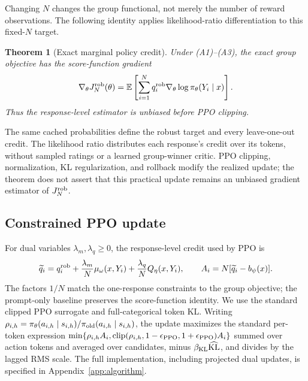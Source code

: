 \documentclass{article}
\newtheorem{theorem}{Theorem}
\theoremstyle{definition}
\theoremstyle{remark}
\begin{document}
Changing \(N\) changes the group functional, not merely the number of reward
observations. The following identity applies likelihood-ratio differentiation
\citep{williams1992simple,sutton1999policy} to this fixed-\(N\) target.

\begin{theorem}[Exact marginal policy credit]
\label{thm:main-gradient}
Under (A1)--(A3), the exact group objective has the score-function gradient
\begin{equation}
\label{eq:robust-policy-gradient}
\nabla_\theta J_N^{\rm rob}(\theta)=\mathbb E\left[
\sum_{i=1}^{N}q_i^{\rm rob}\nabla_\theta\log\pi_\theta(Y_i\mid x)\right].
\end{equation}
Thus the response-level estimator is unbiased before PPO clipping.
\end{theorem}

The same cached probabilities define the robust target and every leave-one-out
credit. The likelihood ratio distributes each response's credit over its
tokens, without sampled ratings or a learned group-winner critic. PPO clipping,
normalization, KL regularization, and rollback modify the realized update;
the theorem does not assert that this practical update remains an unbiased
gradient estimator of \(J_N^{\rm rob}\).

\subsection{Constrained PPO update}
\label{subsec:constrained-credit}

For dual variables \(\lambda_m,\lambda_q\ge0\), the response-level credit used
by PPO is
\begin{equation}
\label{eq:constrained-credit}
\widetilde q_i=q_i^{\rm rob}+\frac{\lambda_m}{N}\mu_\omega(x,Y_i)
 +\frac{\lambda_q}{N}Q_\eta(x,Y_i),\qquad
A_i=N[\widetilde q_i-b_\psi(x)].
\end{equation}
The factors \(1/N\) match the one-response constraints to the group objective;
the prompt-only baseline preserves the score-function identity.  We use the
standard clipped PPO surrogate \citep{schulman2017proximal} and
full-categorical token KL.  Writing
\(\rho_{i,h}=\pi_\theta(a_{i,h}\mid s_{i,h})/
\pi_{\rm old}(a_{i,h}\mid s_{i,h})\), the update maximizes the standard
per-token expression \(\min\{\rho_{i,h}A_i,
\operatorname{clip}(\rho_{i,h},1-\epsilon_{\rm PPO},1+\epsilon_{\rm PPO})A_i\}\)
summed over action tokens and averaged over candidates, minus
\(\beta_{\rm KL}\widehat{\mathrm{KL}}\), and divides
by the lagged RMS scale.  The full implementation, including projected dual
updates, is specified in Appendix~\ref{app:algorithm}.
\end{document}
